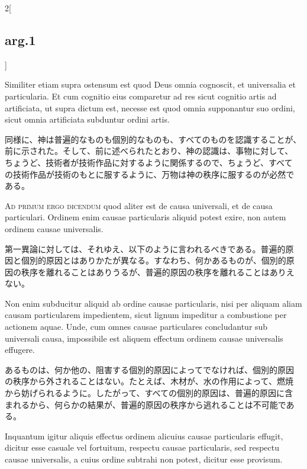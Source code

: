 \documentclass[paper=a4paper,fontsize=10pt,jafontsize=9pt,titlepage]{jlreq}
\begin{document}
\begin{paracol}{2}[\subsection{arg.1}]
\switchcolumn*

Similiter etiam
supra ostensum est quod Deus omnia cognoscit, et universalia et
particularia. Et cum cognitio eius comparetur ad res sicut cognitio
artis ad artificiata, ut supra dictum est, necesse est quod omnia
supponantur suo ordini, sicut omnia artificiata subduntur ordini artis.

\switchcolumn

同様に、神は普遍的なものも個別的なものも、すべてのものを認識することが、
前に示された。そして、前に述べられたとおり、神の認識は、事物に対して、
ちょうど、技術者が技術作品に対するように関係するので、ちょうど、すべて
の技術作品が技術のもとに服するように、万物は神の秩序に服するのが必然で
ある。

\switchcolumn*[\subsection{ad.1}]

{\scshape Ad primum ergo dicendum} quod aliter est de
causa universali, et de causa particulari. Ordinem enim causae
particularis aliquid potest exire, non autem ordinem causae
universalis.

\switchcolumn

第一異論に対しては、それゆえ、以下のように言われるべきである。普遍的原
因と個別的原因とはありかたが異なる。すなわち、何かあるものが、個別的原
因の秩序を離れることはありうるが、普遍的原因の秩序を離れることはありえ
ない。

\switchcolumn*

Non enim subducitur aliquid ab ordine causae particularis,
nisi per aliquam aliam causam particularem impedientem, sicut lignum
impeditur a combustione per actionem aquae. Unde, cum omnes causae
particulares concludantur sub universali causa, impossibile est aliquem
effectum ordinem causae universalis effugere.

\switchcolumn

あるものは、何か他の、阻害する個別的原因によってでなければ、個別的原因
の秩序から外されることはない。たとえば、木材が、水の作用によって、燃焼
から妨げられるように。したがって、すべての個別的原因は、普遍的原因に含
まれるから、何らかの結果が、普遍的原因の秩序から逃れることは不可能であ
る。

\switchcolumn*

Inquantum igitur aliquis
effectus ordinem alicuius causae particularis effugit, dicitur esse
casuale vel fortuitum, respectu causae particularis, sed respectu causae
universalis, a cuius ordine subtrahi non potest, dicitur esse
provisum.


\end{paracol}
\end{document}
